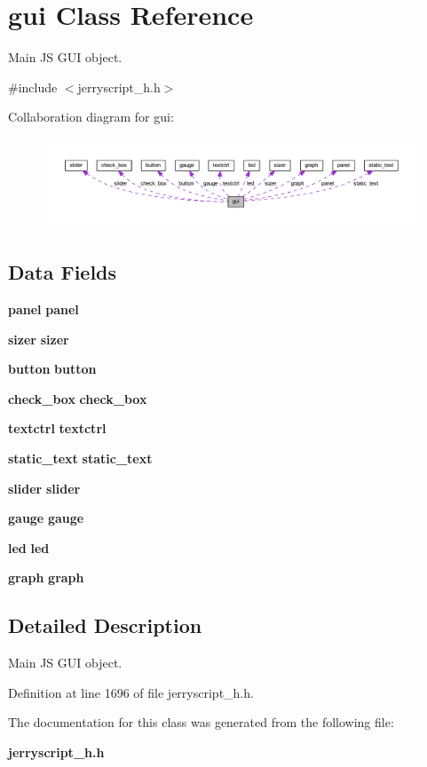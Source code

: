 \section{gui Class Reference}
\label{classgui}


Main JS G\+UI object.  




{\ttfamily \#include $<$jerryscript\+\_\+h.\+h$>$}



Collaboration diagram for gui\+:\nopagebreak
\begin{figure}[H]
\begin{center}
\leavevmode
\includegraphics[width=350pt]{classgui__coll__graph}
\end{center}
\end{figure}
\subsection*{Data Fields}
\begin{DoxyCompactItemize}
\item 
\mbox{\label{classgui_a5865d95b775346aee2512dec1b27701f}} 
\textbf{ panel} {\bfseries panel}
\item 
\mbox{\label{classgui_aa6a729e4fc40c42b5a0b572302e714df}} 
\textbf{ sizer} {\bfseries sizer}
\item 
\mbox{\label{classgui_a9d9f18ad7021aaf102ccc991439eb6fb}} 
\textbf{ button} {\bfseries button}
\item 
\mbox{\label{classgui_ad51c81be1a96dbb9e6393615d1dc77b4}} 
\textbf{ check\+\_\+box} {\bfseries check\+\_\+box}
\item 
\mbox{\label{classgui_af2fb20dbecb7ec6c3125f354d56bbb5f}} 
\textbf{ textctrl} {\bfseries textctrl}
\item 
\mbox{\label{classgui_a4b00419b90d4fab69c342922abe0ac18}} 
\textbf{ static\+\_\+text} {\bfseries static\+\_\+text}
\item 
\mbox{\label{classgui_a0b517e9ac438dbad32a8405260f3e739}} 
\textbf{ slider} {\bfseries slider}
\item 
\mbox{\label{classgui_a1e350661061c75e580e13d87b9710f4f}} 
\textbf{ gauge} {\bfseries gauge}
\item 
\mbox{\label{classgui_a57e07c822bd8ed5d043e8618bd8d1ad2}} 
\textbf{ led} {\bfseries led}
\item 
\mbox{\label{classgui_a7d931efceb60400ac611d573ac0a9e99}} 
\textbf{ graph} {\bfseries graph}
\end{DoxyCompactItemize}


\subsection{Detailed Description}
Main JS G\+UI object. 

Definition at line 1696 of file jerryscript\+\_\+h.\+h.



The documentation for this class was generated from the following file\+:\begin{DoxyCompactItemize}
\item 
\textbf{ jerryscript\+\_\+h.\+h}\end{DoxyCompactItemize}
